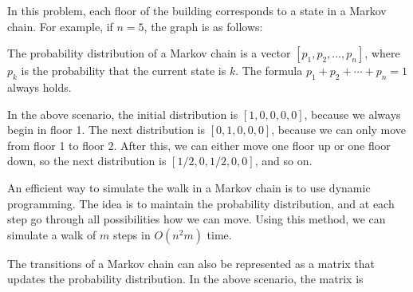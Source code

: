In this problem, each floor of the building
corresponds to a state in a Markov chain.
For example, if $n=5$, the graph is as follows:

\begin{center}
\end{center}

The probability distribution
of a Markov chain is a vector
$[p_1,p_2,\ldots,p_n]$, where $p_k$ is the
probability that the current state is $k$.
The formula $p_1+p_2+\cdots+p_n=1$ always holds.

In the above scenario, the initial distribution is
$[1,0,0,0,0]$, because we always begin in floor 1.
The next distribution is $[0,1,0,0,0]$,
because we can only move from floor 1 to floor 2.
After this, we can either move one floor up
or one floor down, so the next distribution is
$[1/2,0,1/2,0,0]$, and so on.

An efficient way to simulate the walk in
a Markov chain is to use dynamic programming.
The idea is to maintain the probability distribution,
and at each step go through all possibilities
how we can move.
Using this method, we can simulate
a walk of $m$ steps in $O(n^2 m)$ time.

The transitions of a Markov chain can also be
represented as a matrix that updates the
probability distribution.
In the above scenario, the matrix is

